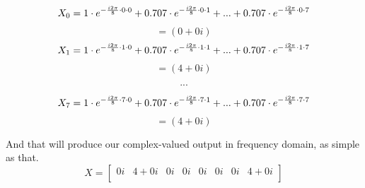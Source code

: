 \documentclass[
  oneside,
  11pt, a4paper,
  footinclude=true,
  headinclude=true,
  cleardoublepage=empty
]{scrbook}
\begin{document}
\begin{equation*}
    X_{0} = 1 \cdot e^{- \frac{i 2 \pi}{8} \cdot 0 \cdot 0} \\
        + 0.707 \cdot e^{- \frac{i 2 \pi}{8} \cdot 0 \cdot 1}  \\
        + ...  \\
        + 0.707 \cdot e^{- \frac{i 2 \pi}{8} \cdot 0 \cdot 7} \\
\end{equation*}
\begin{equation*}
    = (0 + 0i)
\end{equation*}
\begin{equation*}
    X_{1} = 1 \cdot e^{- \frac{i 2 \pi}{8} \cdot 1 \cdot 0} \\
        + 0.707 \cdot e^{- \frac{i 2 \pi}{8} \cdot 1 \cdot 1}  \\
        + ...  \\
        + 0.707 \cdot e^{- \frac{i 2 \pi}{8} \cdot 1 \cdot 7} \\
\end{equation*}
\begin{equation*}
    = (4 + 0i)
\end{equation*}

\begin{equation*}
    . . .
\end{equation*}

\begin{equation*}
    X_{7} = 1 \cdot e^{- \frac{i 2 \pi}{8} \cdot 7 \cdot 0} \\
        + 0.707 \cdot e^{- \frac{i 2 \pi}{8} \cdot 7 \cdot 1}  \\
        + ...  \\
        + 0.707 \cdot e^{- \frac{i 2 \pi}{8} \cdot 7 \cdot 7} \\
\end{equation*}
\begin{equation*}
    = (4 + 0i)
\end{equation*}


And that will produce our complex-valued output in frequency domain, as simple as that.
\begin{equation*}
    X = 
    \begin{bmatrix}
        0i & 4+0i & 0i & 0i & 0i & 0i & 0i & 4+0i\\
    \end{bmatrix}
\end{equation*}
\end{document}
